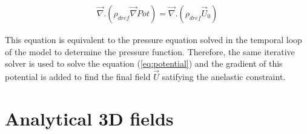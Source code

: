 \begin{eqnarray}
\vec { \nabla } .  \left( \rho _{dref} \vec {\nabla } Pot \right) = \vec { \nabla } .
 \left( \rho _{dref}  \vec{U} _0 \right) \label{eq:potential}
\end{eqnarray}

This equation is equivalent to the pressure equation solved in the temporal loop
of the model to determine the pressure function. Therefore, the same iterative
solver is used to solve the equation (\ref{eq:potential}) and the gradient of this
potential is added to find the final field $\vec{U}$ satifying  the anelastic constraint.


\section{Analytical 3D fields}

